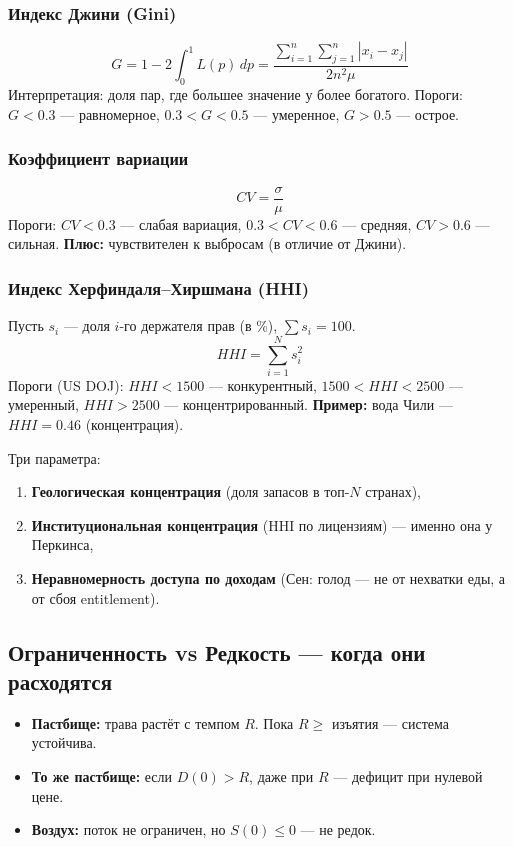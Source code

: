 \documentclass[12pt]{article}
\begin{document}
\subsubsection{Индекс Джини (Gini)}
$$
G = 1 - 2\int_0^1 L(p)\,dp
   = \frac{\sum_{i=1}^n\sum_{j=1}^n |x_i-x_j|}{2n^2\mu}
$$
Интерпретация: доля пар, где большее значение у более богатого.
Пороги: $G<0.3$ — равномерное, $0.3<G<0.5$ — умеренное, $G>0.5$ — острое.

\subsubsection{Коэффициент вариации}
$$
CV = \frac{\sigma}{\mu}
$$
Пороги: $CV<0.3$ — слабая вариация, $0.3<CV<0.6$ — средняя, $CV>0.6$ — сильная.
\textbf{Плюс:} чувствителен к выбросам (в отличие от Джини).

\subsubsection{Индекс Херфиндаля–Хиршмана (HHI)}
Пусть $s_i$ — доля $i$-го держателя прав (в \%), $\sum s_i = 100$.
$$
HHI = \sum_{i=1}^N s_i^2
$$
Пороги (US DOJ): $HHI<1500$ — конкурентный, $1500<HHI<2500$ — умеренный, $HHI>2500$ — концентрированный.
\textbf{Пример:} вода Чили — $HHI=0.46$ (концентрация).



Три параметра:
\begin{enumerate}
\item \textbf{Геологическая концентрация} (доля запасов в топ-$N$ странах),
\item \textbf{Институциональная концентрация} (HHI по лицензиям) --- именно она у Перкинса,
\item \textbf{Неравномерность доступа по доходам} (Сен: голод --- не от нехватки еды, а от сбоя entitlement).
\end{enumerate}

\subsection{Ограниченность vs Редкость --- когда они расходятся}
\begin{itemize}
\item \textbf{Пастбище:} трава растёт с темпом $R$. Пока $R \ge$ изъятия --- система устойчива.
\item \textbf{То же пастбище:} если $D(0) > R$, даже при $R$ --- дефицит при нулевой цене.
\item \textbf{Воздух:} поток не ограничен, но $S(0) \le 0$ --- не редок.
\end{itemize}
\end{document}
